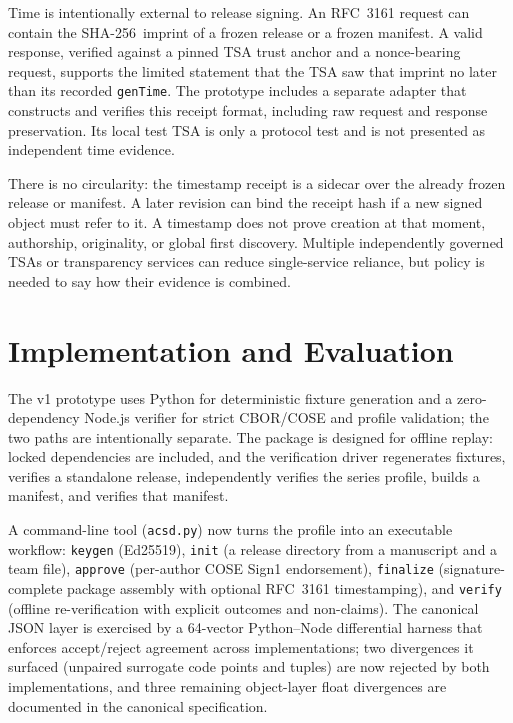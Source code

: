 \documentclass[11pt]{article}
\newcommand{\sha}{\textsf{SHA-256}}
\begin{document}
Time is intentionally external to release signing. An RFC~3161 request can contain the \sha\ imprint of a frozen release or a frozen manifest. A valid response, verified against a pinned TSA trust anchor and a nonce-bearing request, supports the limited statement that the TSA saw that imprint no later than its recorded \texttt{genTime}. The prototype includes a separate adapter that constructs and verifies this receipt format, including raw request and response preservation. Its local test TSA is only a protocol test and is not presented as independent time evidence.

There is no circularity: the timestamp receipt is a sidecar over the already frozen release or manifest. A later revision can bind the receipt hash if a new signed object must refer to it. A timestamp does not prove creation at that moment, authorship, originality, or global first discovery. Multiple independently governed TSAs or transparency services can reduce single-service reliance, but policy is needed to say how their evidence is combined.

\section{Implementation and Evaluation}

The v1 prototype uses Python for deterministic fixture generation and a zero-dependency Node.js verifier for strict CBOR/COSE and profile validation; the two paths are intentionally separate. The package is designed for offline replay: locked dependencies are included, and the verification driver regenerates fixtures, verifies a standalone release, independently verifies the series profile, builds a manifest, and verifies that manifest.

A command-line tool (\texttt{acsd.py}) now turns the profile into an executable workflow: \texttt{keygen} (Ed25519), \texttt{init} (a release directory from a manuscript and a team file), \texttt{approve} (per-author COSE Sign1 endorsement), \texttt{finalize} (signature-complete package assembly with optional RFC~3161 timestamping), and \texttt{verify} (offline re-verification with explicit outcomes and non-claims). The canonical JSON layer is exercised by a 64-vector Python--Node differential harness that enforces accept/reject agreement across implementations; two divergences it surfaced (unpaired surrogate code points and tuples) are now rejected by both implementations, and three remaining object-layer float divergences are documented in the canonical specification.
\end{document}
